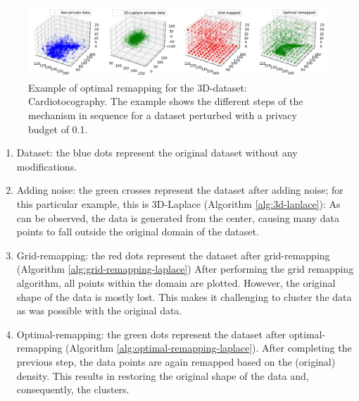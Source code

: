\begin{figure}[H]
  \includegraphics[width=1.1\textwidth]{TheorethicalFramework/ND-Laplace/Images/optimal-remapping-example.png}
  \caption{Example of optimal remapping for the 3D-dataset: Cardiotocography. The example shows the different steps of the mechanism in sequence for a dataset perturbed with a privacy budget of 0.1.}
\end{figure}

\begin{enumerate}
  \item Dataset: the blue dots represent the original dataset without any modifications.
  \item Adding noise: the green crosses represent the dataset after adding noise; for this particular example, this is 3D-Laplace (Algorithm \ref{alg:3d-laplace}):
        As can be observed, the data is generated from the center, causing many data points to fall outside the original domain of the dataset.
  \item Grid-remapping: the red dots represent the dataset after grid-remapping (Algorithm \ref{alg:grid-remapping-laplace})
        After performing the grid remapping algorithm, all points within the domain are plotted.
        However, the original shape of the data is mostly lost.
        This makes it challenging to cluster the data as was possible with the original data.
  \item Optimal-remapping: the green dots represent the dataset after optimal-remapping (Algorithm \ref{alg:optimal-remapping-laplace}).
        After completing the previous step, the data points are again remapped based on the (original) density.
        This results in restoring the original shape of the data and, consequently, the clusters.
\end{enumerate}
